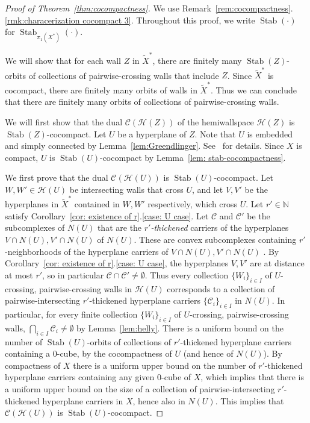\documentclass[12pt,oneside]{amsart}
\theoremstyle{definition}
\theoremstyle{definition}
\theoremstyle{remark}
\newcommand{\C}{\mathcal{C}}
\newcommand{\Hem}{\mathcal{H}}
\DeclareMathOperator{\Stab}{Stab}
\begin{document}
\begin{proof}[Proof of Theorem~\ref{thm:cocompactness}]
We  use Remark~\ref{rem:cocompactness}.\eqref{rmk:characerization cocompact 3}. 
Throughout this proof,  we write $\Stab(\cdot)$ for $\Stab_{\pi_1(X^*)}(\cdot)$.

We will show that for each wall $Z$  in $\widetilde X^*$, there are finitely many  $\Stab(Z)$-orbits of collections of pairwise-crossing walls that include $Z$.
Since $\widetilde X^*$ is cocompact, there are finitely many orbits of walls in $\widetilde X^*$.
Thus we can conclude that there are finitely many orbits of collections of pairwise-crossing walls.

We will first show that the dual $\C(\Hem(Z))$ of the hemiwallspace $\Hem(Z)$ is $\Stab(Z)$-cocompact.
Let $U$ be a hyperplane of $Z$. Note that $U$ is embedded and simply connected by Lemma~\ref{lem:Greendlinger}. See~\cite[Lem~3.11(i)+(ii)]{Arenas24asph} for details.
Since $X$ is compact, $U$ is $\Stab( U)$-cocompact by Lemma~\ref{lem: stab-cocompactness}.


We first prove that the dual 
$\C(\Hem(U))$
is $\Stab(U)$-cocompact. 
%
Let $W, W'\in \Hem(U)$ be intersecting walls that cross $U$,
and let $V, V'$ be the hyperplanes in $\widetilde X^*$ contained in $W,W'$ respectively, which cross $U$.
Let $r'\in \mathbb N$ satisfy Corollary~\ref{cor: existence of r}.\eqref{case: U case}.
 Let $\C$ and $\C'$ be the subcomplexes of $N(U)$ that are the \emph{$r'$-thickened} carriers of the hyperplanes $V\cap N(U), V'\cap N(U)$ of $N(U)$. These are convex subcomplexes containing $r'$-neighborhoods of the hyperplane carriers of $V\cap N(U), V'\cap N(U)$ \cite{HaglundWiseCombination}.
 By Corollary~\ref{cor: existence of r}.\eqref{case: U case}, the hyperplanes $V,V'$ are at distance at most $r'$, so in particular $\C\cap \C' \neq \emptyset$.
%
Thus every collection $\{W_i\}_{i \in I}$ of $U$-crossing, pairwise-crossing walls in $\Hem(U)$
corresponds to a collection of pairwise-intersecting $r'$-thickened hyperplane carriers $\{\C_i\}_{i \in I}$ in $N(U)$.
In particular, for every finite collection $\{W_i\}_{i \in I}$ of $U$-crossing, pairwise-crossing walls, $\bigcap_{i
\in I} \C_i \neq \emptyset$ by Lemma~\ref{lem:helly}. 
%
There is a uniform bound on the number of $\Stab(U)$-orbits of collections of $r'$-thickened hyperplane carriers containing a $0$-cube, by the cocompactness of $U$ (and hence of $N(U)$). 
By compactness of $X$ there is a uniform upper bound on the number of $r'$-thickened hyperplane carriers containing any given $0$-cube of $X$, which implies that there is a uniform upper bound on the size of a collection of pairwise-intersecting $r'$-thickened hyperplane carriers in $X$, hence also in $N(U)$.
%
%
This implies that $\C(\Hem(U))$ is $\Stab(U)$-cocompact. 



\end{proof}
\end{document}
